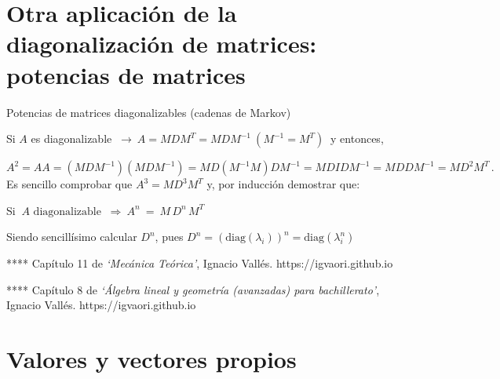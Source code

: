 \color{black}



\section[Otra aplicación de la diagonalización de matrices: potencias de matrices]{Otra aplicación de la diagonalización de matrices: potencias de matrices}
\vspace{-5mm}

\begin{myexampleblock} {Potencias de matrices diagonalizables (cadenas de Markov)}
	
\vspace{2mm}	Si $A$ es diagonalizable $\ \to \ A=MDM^T=MDM^{-1}\ (M^{-1}=M^T)\ $ y entonces,
	
\vspace{2mm}	$A^2=AA=(MDM^{-1})(MDM^{-1})=MD(M^{-1}M)DM^{-1}=MDIDM^{-1}=MDDM^{-1}=MD^2M^T\, . \ $ Es sencillo comprobar que $A^3=MD^3M^T$ y, por inducción demostrar que:
	
\vspace{2mm}	Si $\ A \text{ diagonalizable } \ \Rightarrow \ A^n\ = \ M \, D^n\, M^T $
	
\vspace{2mm} Siendo sencillísimo calcular $D^n$, pues $D^n=\left( \text{diag} (\lambda_i) \right)^n=\text{diag} (\lambda_i^n) $
\vspace{2mm}	
	
\end{myexampleblock}

**** Capítulo 11 de \emph{`Mecánica Teórica'}, \textsf{Ignacio Vallés}. \textcolor{NavyBlue}{https://igvaori.github.io}


**** Capítulo 8 de \emph{`Álgebra lineal y geometría (avanzadas) para bachillerato'}, 
\textsf{Ignacio Vallés}. 
\textcolor{NavyBlue}{https://igvaori.github.io}

\section{Valores y vectores propios}

